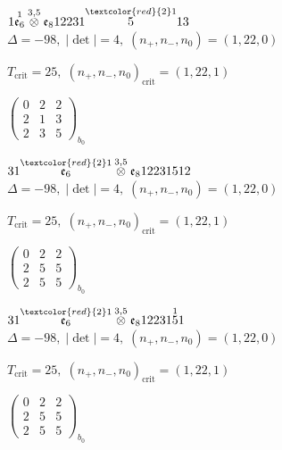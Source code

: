 \documentclass[10pt]{article}
\begin{document}
\smallskip

$1\overset{1}{\mathfrak{e}_6}\overset{3,5}{\otimes}\mathfrak{e}_812231\overset{\textcolor{red}{2}1}{5}13$ \quad $\Delta=-98,\; |\det|=4,\; (n_+,n_-,n_0)=(1,22,0)$

\hspace{1em}$T_{\text{crit}}=25,\; (n_+,n_-,n_0)_{\text{crit}}=(1,22,1)$

\hspace{2em}$\left(\begin{smallmatrix}0 & 2 & 2 \\ 2 & 1 & 3 \\ 2 & 3 & 5\end{smallmatrix}\right)_{\!b_0}$

\smallskip

$31\overset{\textcolor{red}{2}1}{\mathfrak{e}_6}\overset{3,5}{\otimes}\mathfrak{e}_812231512$ \quad $\Delta=-98,\; |\det|=4,\; (n_+,n_-,n_0)=(1,22,0)$

\hspace{1em}$T_{\text{crit}}=25,\; (n_+,n_-,n_0)_{\text{crit}}=(1,22,1)$

\hspace{2em}$\left(\begin{smallmatrix}0 & 2 & 2 \\ 2 & 5 & 5 \\ 2 & 5 & 5\end{smallmatrix}\right)_{\!b_0}$

\smallskip

$31\overset{\textcolor{red}{2}1}{\mathfrak{e}_6}\overset{3,5}{\otimes}\mathfrak{e}_812231\overset{1}{5}1$ \quad $\Delta=-98,\; |\det|=4,\; (n_+,n_-,n_0)=(1,22,0)$

\hspace{1em}$T_{\text{crit}}=25,\; (n_+,n_-,n_0)_{\text{crit}}=(1,22,1)$

\hspace{2em}$\left(\begin{smallmatrix}0 & 2 & 2 \\ 2 & 5 & 5 \\ 2 & 5 & 5\end{smallmatrix}\right)_{\!b_0}$
\end{document}
